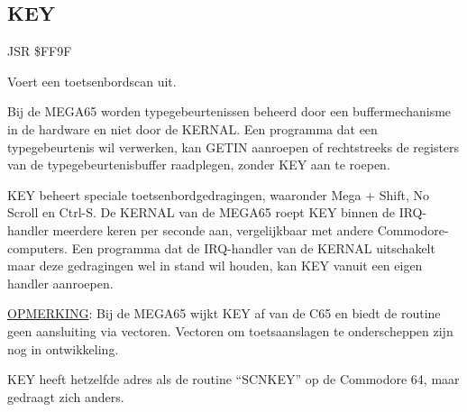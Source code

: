 
\newpage
\subsection{KEY}
\label{KERNAL Jump Table!KEY}
\begin{description}[leftmargin=2cm,style=nextline]
    \item [Adres:] JSR \$FF9F    \item [Omschrijving:] Voert een toetsenbordscan uit.    \item [Opmerkingen:]        Bij de MEGA65 worden typegebeurtenissen beheerd door een buffermechanisme in de hardware en niet door de KERNAL. Een programma dat een typegebeurtenis wil verwerken, kan GETIN aanroepen of rechtstreeks de registers van de typegebeurtenisbuffer raadplegen, zonder KEY aan te roepen.

        KEY beheert speciale toetsenbordgedragingen, waaronder Mega + Shift, No Scroll en Ctrl-S. De KERNAL van de MEGA65 roept KEY binnen de IRQ-handler meerdere keren per seconde aan, vergelijkbaar met andere Commodore-computers. Een programma dat de IRQ-handler van de KERNAL uitschakelt maar deze gedragingen wel in stand wil houden, kan KEY vanuit een eigen handler aanroepen.

        \underline{OPMERKING}: Bij de MEGA65 wijkt KEY af van de C65 en biedt de routine geen aansluiting via vectoren. Vectoren om toetsaanslagen te onderscheppen zijn nog in ontwikkeling.

        KEY heeft hetzelfde adres als de routine ``SCNKEY'' op de Commodore 64, maar gedraagt zich anders.    \item [Voorbeeld:]
\end{description}



\newpage
